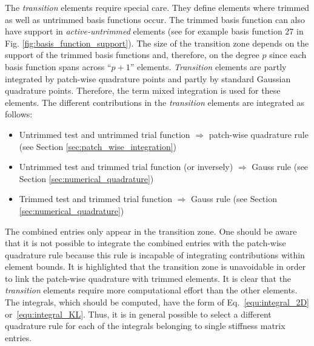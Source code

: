 \documentclass[3p]{elsarticle}
\begin{document}
The \textit{transition} elements require special care. They define elements where trimmed as well as untrimmed basis functions occur. The trimmed basis function can also have support in \textit{active-untrimmed} elements (see for example basis function 27 in Fig. \ref{fig:basis_function_support}). The size of the transition zone depends on the support of the trimmed basis functions and, therefore, on the degree $p$ since each basis function spans across ``$p+1$'' elements. \textit{Transition} elements are partly integrated by patch-wise quadrature points and partly by standard Gaussian quadrature points. Therefore, the term mixed integration is used for these elements. The different contributions in the \textit{transition} elements are integrated as follows:
\begin{itemize}
	\item Untrimmed test and untrimmed trial function $\Longrightarrow$ patch-wise quadrature rule (see Section \ref{sec:patch_wise_integration})
	\item Untrimmed test and trimmed trial function (or inversely) $\Longrightarrow$ Gauss rule (see Section \ref{sec:numerical_quadrature})
	\item Trimmed test and trimmed trial function $\Longrightarrow$ Gauss rule (see Section \ref{sec:numerical_quadrature})
\end{itemize}
The combined entries only appear in the transition zone. One should be aware that it is not possible to integrate the combined entries with the patch-wise quadrature rule because this rule is incapable of integrating contributions within element bounds. It is highlighted that the transition zone is unavoidable in order to link the patch-wise quadrature with trimmed elements. It is clear that the \textit{transition} elements require more computational effort than the other elements. The integrals, which should be computed, have the form of Eq.~\eqref{equ:integral_2D} or~\eqref{equ:integral_KL}. Thus, it is in general possible to select a different quadrature rule for each of the integrals belonging to single stiffness matrix entries.
\end{document}
